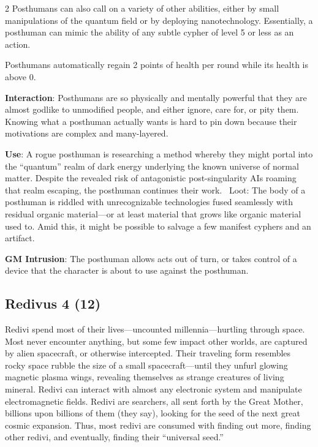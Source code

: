 \begin{multicols}{2}
Posthumans can also call on a variety of other abilities, either by small manipulations of the quantum field or by deploying nanotechnology. Essentially, a posthuman can mimic the ability of any subtle cypher of level 5 or less as an action. 

Posthumans automatically regain 2 points of health per round while its health is above 0. 

\textbf{Interaction}: Posthumans are so physically and mentally powerful that they are almost godlike to unmodified people, and either ignore, care for, or pity them. Knowing what a posthuman actually wants is hard to pin down because their motivations are complex and many-layered. 

\textbf{Use}: A rogue posthuman is researching a method whereby they might portal into the “quantum” realm of dark energy underlying the known universe of normal matter. Despite the revealed risk of antagonistic post-singularity AIs roaming that realm escaping, the posthuman continues their work. 
Loot: The body of a posthuman is riddled with unrecognizable technologies fused seamlessly with residual organic material—or at least material that grows like organic material used to. Amid this, it might be possible to salvage a few manifest cyphers and an artifact.

\textbf{GM Intrusion}: The posthuman allows acts out of turn, or takes control of a device that the character is about to use against the posthuman.

\subsection{Redivus 4 (12)}

Redivi spend most of their lives—uncounted millennia—hurtling through space. Most never encounter anything, but some few impact other worlds, are captured by alien spacecraft, or otherwise intercepted. Their traveling form resembles rocky space rubble the size of a small spacecraft—until they unfurl glowing magnetic plasma wings, revealing themselves as strange creatures of living mineral. Redivi can interact with almost any electronic system and manipulate electromagnetic fields. Redivi are searchers, all sent forth by the Great Mother, billions upon billions of them (they say), looking for the seed of the next great cosmic expansion. Thus, most redivi are consumed with finding out more, finding other redivi, and eventually, finding their “universal seed.” 


\end{multicols}
